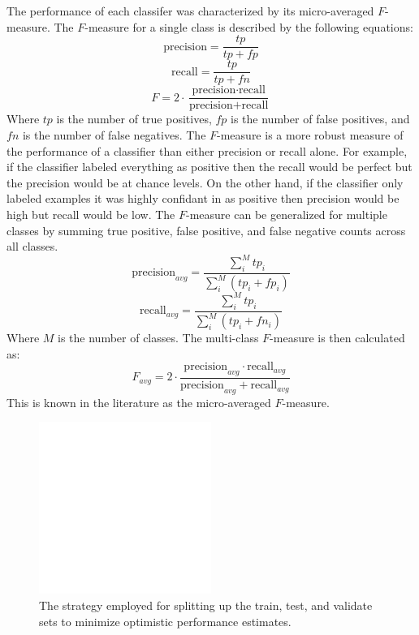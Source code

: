 \documentclass[twocolumn,final]{article}
\begin{document}
The performance of each classifer was characterized by its micro-averaged $F$-measure. 
The $F$-measure for a single class is described by the following equations:
\begin{equation}
\mbox{precision} = \frac{tp}{tp + fp}
\label{eqn:precision}
\end{equation}
\begin{equation}
\mbox{recall} = \frac{tp}{tp + fn}
\label{eqn:recall}
\end{equation}
\begin{equation}
F = 2 \cdot \frac{\mbox{precision} \cdot \mbox{recall}}{\mbox{precision} + \mbox{recall}}
\label{eqn:f1}
\end{equation}
Where $tp$ is the number of true positives, $fp$ is the number of false positives, and $fn$ is the number of false negatives.
The $F$-measure is a more robust measure of the performance of a classifier than either precision or recall alone.
For example, if the classifier labeled everything as positive then the recall would be perfect but the precision would be at chance levels.
On the other hand, if the classifier only labeled examples it was highly confidant in as positive then precision would be high but recall would be low.
The $F$-measure can be generalized for multiple classes by summing true positive, false positive, and false negative counts across all classes.
\begin{equation}
\mbox{precision}_{avg} =\frac{\sum_{i}^{M}{tp_{i}}}{\sum_{i}^{M}{\left( tp_{i} + fp_{i} \right)}}
\end{equation}
\begin{equation}
\mbox{recall}_{avg} = \frac{\sum_{i}^{M}{tp_{i}}}{\sum_{i}^{M}{\left( tp_{i} + fn_{i} \right)}}
\end{equation}
Where $M$ is the number of classes.
The multi-class $F$-measure is then calculated as:
\begin{equation}
F_{avg} = 2 \cdot \frac{\mbox{precision}_{avg} \cdot \mbox{recall}_{avg}}{\mbox{precision}_{avg} + \mbox{recall}_{avg}}
\end{equation}
This is known in the literature as the  micro-averaged $F$-measure.

\begin{figure}[!htbp]
\centering
\includegraphics[width=0.5\textwidth]{figures/placeholder}
\caption{The strategy employed for splitting up the train, test, and validate sets to minimize optimistic performance estimates.}
\label{fig:data-split}
\end{figure}
\end{document}
